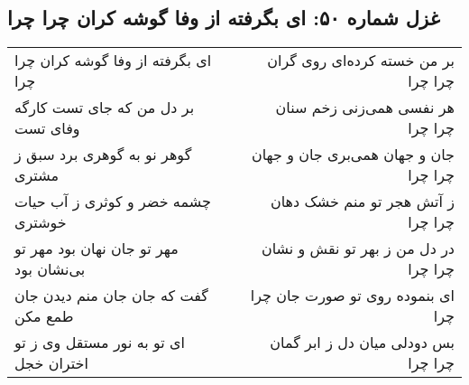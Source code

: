 \begin{center}
\section*{غزل شماره ۵۰: ای بگرفته از وفا گوشه کران چرا چرا}
\label{sec:0050}
\begin{longtable}{l p{0.5cm} r}
ای بگرفته از وفا گوشه کران چرا چرا
&&
بر من خسته کرده‌ای روی گران چرا چرا
\\
بر دل من که جای تست کارگه وفای تست
&&
هر نفسی همی‌زنی زخم سنان چرا چرا
\\
گوهر نو به گوهری برد سبق ز مشتری
&&
جان و جهان همی‌بری جان و جهان چرا چرا
\\
چشمه خضر و کوثری ز آب حیات خوشتری
&&
ز آتش هجر تو منم خشک دهان چرا چرا
\\
مهر تو جان نهان بود مهر تو بی‌نشان بود
&&
در دل من ز بهر تو نقش و نشان چرا چرا
\\
گفت که جان جان منم دیدن جان طمع مکن
&&
ای بنموده روی تو صورت جان چرا چرا
\\
ای تو به نور مستقل وی ز تو اختران خجل
&&
بس دودلی میان دل ز ابر گمان چرا چرا
\\
\end{longtable}
\end{center}
